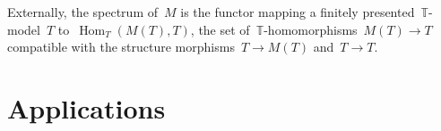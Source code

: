 \documentclass[oneside,reqno]{amsart}
\theoremstyle{definition}
\theoremstyle{plain}
\theoremstyle{remark}
\newcommand{\E}{\mathcal{E}}
\newcommand{\TT}{\mathbb{T}}
\DeclareMathOperator{\Hom}{Hom}
\newcommand{\Set}{\mathrm{Set}}
\renewcommand{\_}{\mathpunct{.}\,}
\newcommand{\?}{\,{:}\,}
\let\oldul\ul
\renewcommand{\ul}[1]{\text{\oldul{$#1$}}}
\newcommand{\speak}[1]{\ulcorner\text{\textnormal{#1}}\urcorner}
\begin{document}
Externally, the spectrum of~$M$ is the functor
mapping a finitely presented~$\TT$-model~$T$ to~$\Hom_T(M(T), T)$, the set
of~$\TT$-homomorphisms~$M(T) \to T$ compatible with the structure morphisms~$T
\to M(T)$ and~$T \to T$.

\section{Applications}





\printbibliography
\end{document}
